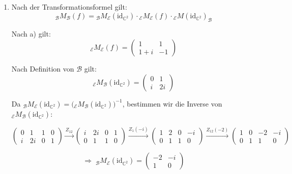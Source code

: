 \documentclass[a4paper,12pt]{article}
\begin{document}
\begin{enumerate}[label=\alph*)]
Die Treppennormalform von ${}_{\mathcal{E}}M_{\mathcal{E}}(f)$ ist $I$.
Folglich ist ${}_{\mathcal{E}}M_{\mathcal{E}}(f)$ invertierbar und demnach ist $f$ bijektiv.
Da $f$ auch linear ist, ist $f$ ein Isomorphismus.

\item Nach der Transformationsformel gilt:
\[
  {}_{\mathcal{B}}M_{\mathcal{B}}(f)
  = {}_{\mathcal{B}}M_{\mathcal{E}}(\mathrm{id}_{\mathbb{C}^2})
    \cdot {}_{\mathcal{E}}M_{\mathcal{E}}(f)
    \cdot {}_{\mathcal{E}}M(\mathrm{id}_{\mathbb{C}^2})_{\mathcal{B}}
\]

Nach a) gilt:
\[
  {}_{\mathcal{E}}M_{\mathcal{E}}(f) = \begin{pmatrix} 1 & 1 \\ 1+i & -1 \end{pmatrix}
\]

Nach Definition von $\mathcal{B}$ gilt:
\[
  {}_{\mathcal{E}}M_{\mathcal{B}}(\mathrm{id}_{\mathbb{C}^2}) = \begin{pmatrix} 0 & 1 \\ i & 2i \end{pmatrix}
\]

Da ${}_{\mathcal{B}}M_{\mathcal{E}}(\mathrm{id}_{\mathbb{C}^2}) = \bigl({}_{\mathcal{E}}M_{\mathcal{B}}(\mathrm{id}_{\mathbb{C}^2})\bigr)^{-1}$,
bestimmen wir die Inverse von ${}_{\mathcal{E}}M_{\mathcal{B}}(\mathrm{id}_{\mathbb{C}^2})$:

\[
  \left(\begin{array}{cc|cc} 0 & 1 & 1 & 0 \\ i & 2i & 0 & 1 \end{array}\right)
  \xrightarrow{Z_{12}}
  \left(\begin{array}{cc|cc} i & 2i & 0 & 1 \\ 0 & 1 & 1 & 0 \end{array}\right)
  \xrightarrow{Z_1(-i)}
  \left(\begin{array}{cc|cc} 1 & 2 & 0 & -i \\ 0 & 1 & 1 & 0 \end{array}\right)
  \xrightarrow{Z_{12}(-2)}
  \left(\begin{array}{cc|cc} 1 & 0 & -2 & -i \\ 0 & 1 & 1 & 0 \end{array}\right)
\]

\[
  \Rightarrow \; {}_{\mathcal{B}}M_{\mathcal{E}}(\mathrm{id}_{\mathbb{C}^2}) = \begin{pmatrix} -2 & -i \\ 1 & 0 \end{pmatrix}
\]


\end{enumerate}
\end{document}

